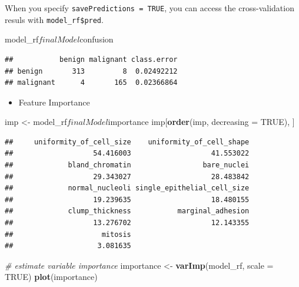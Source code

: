 \documentclass[]{article}
\newenvironment{Shaded}{\begin{snugshade}}{\end{snugshade}}
\newcommand{\KeywordTok}[1]{\textcolor[rgb]{0.13,0.29,0.53}{\textbf{{#1}}}}
\newcommand{\DataTypeTok}[1]{\textcolor[rgb]{0.13,0.29,0.53}{{#1}}}
\newcommand{\StringTok}[1]{\textcolor[rgb]{0.31,0.60,0.02}{{#1}}}
\newcommand{\CommentTok}[1]{\textcolor[rgb]{0.56,0.35,0.01}{\textit{{#1}}}}
\newcommand{\OtherTok}[1]{\textcolor[rgb]{0.56,0.35,0.01}{{#1}}}
\newcommand{\NormalTok}[1]{{#1}}
\providecommand{\tightlist}{%
  \setlength{\itemsep}{0pt}\setlength{\parskip}{0pt}}
\begin{document}
When you specify \texttt{savePredictions\ =\ TRUE}, you can access the
cross-validation resuls with \texttt{model\_rf\$pred}.

\begin{Shaded}
\begin{Highlighting}[]
\NormalTok{model_rf$finalModel$confusion}
\end{Highlighting}
\end{Shaded}

\begin{verbatim}
##           benign malignant class.error
## benign       313         8  0.02492212
## malignant      4       165  0.02366864
\end{verbatim}

\begin{itemize}
\tightlist
\item
  Feature Importance
\end{itemize}

\begin{Shaded}
\begin{Highlighting}[]
\NormalTok{imp <-}\StringTok{ }\NormalTok{model_rf$finalModel$importance}
\NormalTok{imp[}\KeywordTok{order}\NormalTok{(imp, }\DataTypeTok{decreasing =} \OtherTok{TRUE}\NormalTok{), ]}
\end{Highlighting}
\end{Shaded}

\begin{verbatim}
##     uniformity_of_cell_size    uniformity_of_cell_shape 
##                   54.416003                   41.553022 
##             bland_chromatin                 bare_nuclei 
##                   29.343027                   28.483842 
##             normal_nucleoli single_epithelial_cell_size 
##                   19.239635                   18.480155 
##             clump_thickness           marginal_adhesion 
##                   13.276702                   12.143355 
##                     mitosis 
##                    3.081635
\end{verbatim}

\begin{Shaded}
\begin{Highlighting}[]
\CommentTok{# estimate variable importance}
\NormalTok{importance <-}\StringTok{ }\KeywordTok{varImp}\NormalTok{(model_rf, }\DataTypeTok{scale =} \OtherTok{TRUE}\NormalTok{)}
\KeywordTok{plot}\NormalTok{(importance)}
\end{Highlighting}
\end{Shaded}
\end{document}
